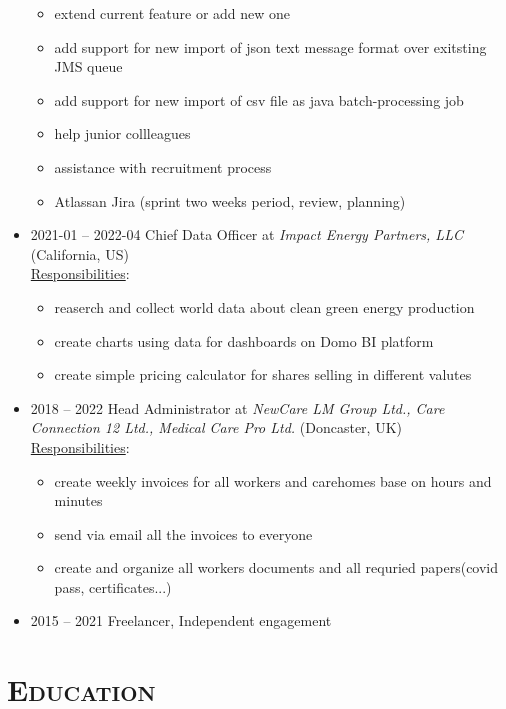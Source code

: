 \documentclass[12pt]{article}
\begin{document}
\begin{itemize}
\begin{itemize}
            \item extend current feature or add new one
            \item add support for new import of json text message format over exitsting JMS queue 
            \item add support for new import of csv file as java batch-processing job
            \item help junior collleagues
            \item assistance with recruitment process
            \item Atlassan Jira (sprint two weeks period, review, planning)
        \end{itemize}

\pagebreak

    \item  2021-01 -- 2022-04 Chief Data Officer at \textit{Impact Energy Partners, LLC} (California, US) \\
        \underline{Responsibilities}:
        \begin{itemize}
            \setlength\itemsep{0em}
            \item reaserch and collect world data about clean green energy production
            \item create charts using data for dashboards on Domo BI platform
            \item create simple pricing calculator for shares selling in different valutes
        \end{itemize}
    \item  2018    -- 2022    Head Administrator at \textit{NewCare LM Group Ltd., Care Connection 12 Ltd., Medical Care Pro Ltd.} (Doncaster, UK) \\
        \underline{Responsibilities}:
        \begin{itemize}
            \setlength\itemsep{0em}
            \item create weekly invoices for all workers and carehomes base on hours and minutes
            \item send via email all the invoices to everyone
            \item create and organize all workers documents and all requried papers(covid pass, certificates...) 
        \end{itemize}
    \item  2015    -- 2021 Freelancer, Independent engagement    
\end{itemize}

\section{\textsc{Education}}
\end{document}
